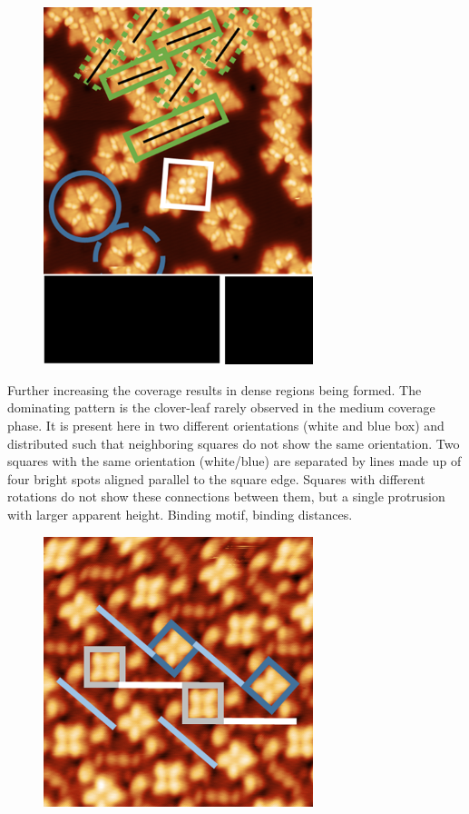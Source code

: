 \begin{figure}[] \centering
	\includegraphics[width=0.7\textwidth]{./images/hbbnc-ag-111-rt-med-coverage}
	\caption{}
	\label{}
\end{figure}

Further increasing the coverage results in dense regions being formed. The dominating pattern is the clover-leaf rarely observed in the medium coverage phase. It is present here in two different orientations (white and blue box) and distributed such that neighboring squares do not show the same orientation. Two squares with the same orientation (white/blue) are separated by lines made up of four bright spots aligned parallel to the square edge. Squares with different rotations do not show these connections between them, but a single protrusion with larger apparent height.
Binding motif, binding distances.


\begin{figure}[] \centering
	\includegraphics[width=0.7\textwidth]{./images/hbbnc-ag-111-rt-high-coverage}
	\caption{}
	\label{}
\end{figure}

